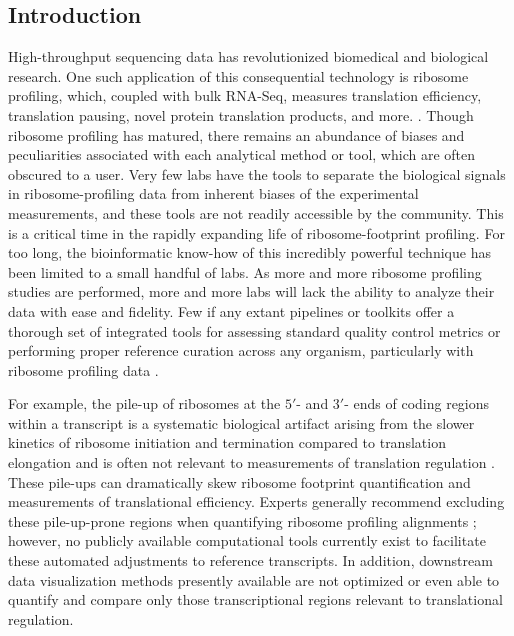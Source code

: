 \documentclass[10pt, oneside]{article}
\begin{document}
\setlength{\parindent}{2em}


\begin{multicols}{2}


\section*{Introduction}
High-throughput sequencing data has revolutionized biomedical and biological research. One such application of this consequential technology is ribosome profiling, which, coupled with bulk RNA-Seq, measures translation efficiency, translation pausing, novel protein translation products, and more. \cite{ingolia_science, riboseq_overview, ingolia_meth}. Though ribosome profiling has matured, there remains an abundance of biases and peculiarities associated with each analytical method or tool, which are often obscured to a user. Very few labs have the tools to separate the biological signals in ribosome-profiling data from inherent biases of the experimental measurements, and these tools are not readily accessible by the community. This is a critical time in the rapidly expanding life of ribosome-footprint profiling. For too long, the bioinformatic know-how of this incredibly powerful technique has been limited to a small handful of labs. As more and more ribosome profiling studies are performed, more and more labs will lack the ability to analyze their data with ease and fidelity. Few if any extant pipelines or toolkits offer a thorough set of integrated tools for assessing standard quality control metrics or performing proper reference curation across any organism, particularly with ribosome profiling data \cite{galaxy, ribogalaxy, nextflow_pipeline, dnanexus_pipeline, riboviz}. \par

For example, the pile-up of ribosomes at the $5'$- and $3'$- ends of coding regions within a transcript is a systematic biological artifact arising from the slower kinetics of ribosome initiation and termination compared to translation elongation and is often not relevant to measurements of translation regulation \cite{gerashchenko_nar, artieri_gr, hussman_plosg}. These pile-ups can dramatically skew ribosome footprint quantification and measurements of translational efficiency. Experts generally recommend excluding these pile-up-prone regions when quantifying ribosome profiling alignments \cite{ingolia_meth, weinberg_reports}; however, no publicly available computational tools currently exist to facilitate these automated adjustments to reference transcripts. In addition, downstream data visualization methods presently available are not optimized or even able to quantify and compare only those transcriptional regions relevant to translational regulation. \par


\end{multicols}
\end{document}
